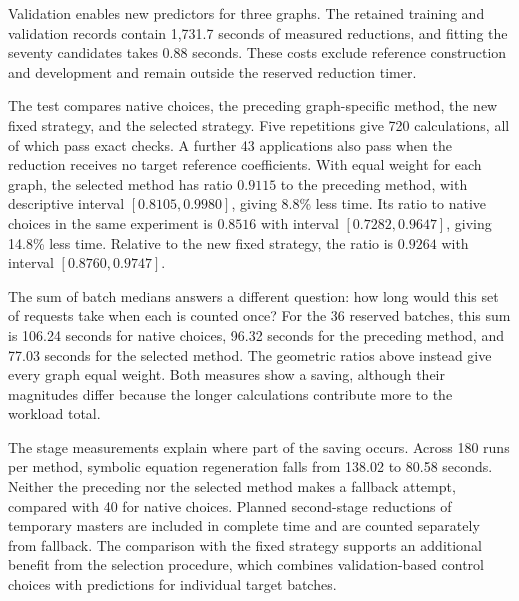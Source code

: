 Validation enables new predictors for three graphs. The retained training and validation records contain 1,731.7 seconds of measured reductions, and fitting the seventy candidates takes 0.88 seconds. These costs exclude reference construction and development and remain outside the reserved reduction timer.

The test compares native choices, the preceding graph-specific method, the new fixed strategy, and the selected strategy. Five repetitions give 720 calculations, all of which pass exact checks. A further 43 applications also pass when the reduction receives no target reference coefficients. With equal weight for each graph, the selected method has ratio $0.9115$ to the preceding method, with descriptive interval $[0.8105,0.9980]$, giving 8.8\% less time. Its ratio to native choices in the same experiment is $0.8516$ with interval $[0.7282,0.9647]$, giving 14.8\% less time. Relative to the new fixed strategy, the ratio is $0.9264$ with interval $[0.8760,0.9747]$.

The sum of batch medians answers a different question: how long would this set of requests take when each is counted once? For the 36 reserved batches, this sum is 106.24 seconds for native choices, 96.32 seconds for the preceding method, and 77.03 seconds for the selected method. The geometric ratios above instead give every graph equal weight. Both measures show a saving, although their magnitudes differ because the longer calculations contribute more to the workload total.

The stage measurements explain where part of the saving occurs. Across 180 runs per method, symbolic equation regeneration falls from 138.02 to 80.58 seconds. Neither the preceding nor the selected method makes a fallback attempt, compared with 40 for native choices. Planned second-stage reductions of temporary masters are included in complete time and are counted separately from fallback. The comparison with the fixed strategy supports an additional benefit from the selection procedure, which combines validation-based control choices with predictions for individual target batches.

